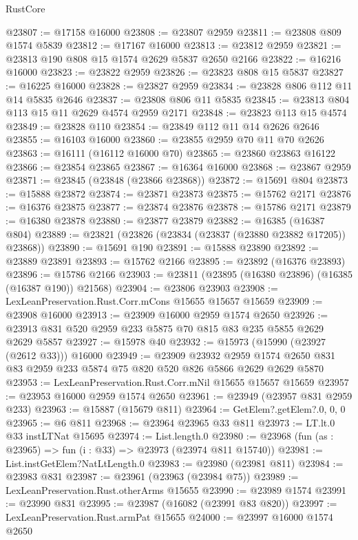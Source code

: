 \begin{lexlean}{RustCore}
\begin{coremodule}
@23807 := @17158 @16000
@23808 := @23807 @2959
@23811 := @23808 @809 @1574 @5839
@23812 := @17167 @16000
@23813 := @23812 @2959
@23821 := @23813 @190 @808 @15 @1574 @2629 @5837 @2650 @2166
@23822 := @16216 @16000
@23823 := @23822 @2959
@23826 := @23823 @808 @15 @5837
@23827 := @16225 @16000
@23828 := @23827 @2959
@23834 := @23828 @806 @112 @11 @14 @5835 @2646
@23837 := @23808 @806 @11 @5835
@23845 := @23813 @804 @113 @15 @11 @2629 @4574 @2959 @2171
@23848 := @23823 @113 @15 @4574
@23849 := @23828 @110
@23854 := @23849 @112 @11 @14 @2626 @2646
@23855 := @16103 @16000
@23860 := @23855 @2959 @70 @11 @70 @2626
@23863 := @16111 (@16112 @16000 @70)
@23865 := @23860 @23863 @16122
@23866 := @23854 @23865
@23867 := @16364 @16000
@23868 := @23867 @2959
@23871 := @23845 (@23848 (@23866 @23868))
@23872 := @15691 @804
@23873 := @15888 @23872
@23874 := @23871 @23873
@23875 := @15762 @2171
@23876 := @16376 @23875
@23877 := @23874 @23876
@23878 := @15786 @2171
@23879 := @16380 @23878
@23880 := @23877 @23879
@23882 := @16385 (@16387 @804)
@23889 := @23821 (@23826 (@23834 (@23837 (@23880 @23882 @17205)) @23868))
@23890 := @15691 @190
@23891 := @15888 @23890
@23892 := @23889 @23891
@23893 := @15762 @2166
@23895 := @23892 (@16376 @23893)
@23896 := @15786 @2166
@23903 := @23811 (@23895 (@16380 @23896) (@16385 (@16387 @190)) @21568)
@23904 := @23806 @23903
@23908 := LexLeanPreservation.Rust.Corr.mCons @15655 @15657 @15659
@23909 := @23908 @16000
@23913 := @23909 @16000 @2959 @1574 @2650
@23926 := @23913 @831 @520 @2959 @233 @5875 @70 @815 @83 @235 @5855 @2629 @2629 @5857
@23927 := @15978 @40
@23932 := @15973 (@15990 (@23927 (@2612 @33))) @16000
@23949 := @23909
    @23932
    @2959
    @1574
    @2650
    @831
    @83
    @2959
    @233
    @5874
    @75
    @820
    @520
    @826
    @5866
    @2629
    @2629
    @5870
@23953 := LexLeanPreservation.Rust.Corr.mNil @15655 @15657 @15659
@23957 := @23953 @16000 @2959 @1574 @2650
@23961 := @23949 (@23957 @831 @2959 @233)
@23963 := @15887 (@15679 @811)
@23964 := GetElem?.getElem?.{0, 0, 0}
@23965 := @6 @811
@23968 := @23964 @23965 @33 @811
@23973 := LT.lt.{0} @33 instLTNat @15695
@23974 := List.length.{0}
@23980 := @23968 (fun (as : @23965) => fun (i : @33) => @23973 (@23974 @811 @15740))
@23981 := List.instGetElem?NatLtLength.{0}
@23983 := @23980 (@23981 @811)
@23984 := @23983 @831
@23987 := @23961 (@23963 (@23984 @75))
@23989 := LexLeanPreservation.Rust.otherArms @15655
@23990 := @23989 @1574
@23991 := @23990 @831
@23995 := @23987 (@16082 (@23991 @83 @820))
@23997 := LexLeanPreservation.Rust.armPat @15655
@24000 := @23997 @16000 @1574 @2650

\end{coremodule}
\end{lexlean}
